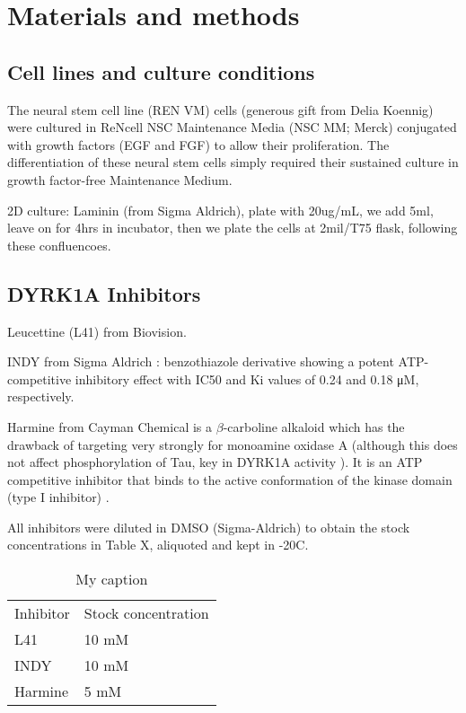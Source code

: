 \documentclass[onecolumn,10pt]{asme2ej}
\begin{document}
\section{Materials and methods}

\subsection{Cell lines and culture conditions}
The neural stem cell line (REN VM) cells (generous gift from Delia Koennig) were cultured in ReNcell NSC Maintenance Media (NSC MM; Merck) conjugated with growth factors (EGF and FGF) to allow their proliferation. The differentiation of these neural stem cells simply required their sustained culture in growth factor-free Maintenance Medium. 

2D culture:
Laminin (from Sigma Aldrich), plate with 20ug/mL, we add 5ml, leave on for 4hrs in incubator, then we plate the cells at 2mil/T75 flask, following these confluencoes.
 

\subsection{DYRK1A Inhibitors}

Leucettine (L41) from Biovision.

 INDY from Sigma Aldrich : benzothiazole derivative showing a potent ATP-competitive inhibitory effect with IC50 and Ki values of 0.24 and 0.18 μM, respectively.
 
 Harmine from Cayman Chemical is a $\beta$-carboline alkaloid which has the drawback of targeting very strongly for monoamine oxidase A (although this does not affect phosphorylation of Tau, key in DYRK1A activity \cite{Frost}). It is an ATP competitive inhibitor that binds to the active conformation of the kinase domain (type I inhibitor) \cite{Ruben2015}.


All inhibitors were diluted in DMSO (Sigma-Aldrich) to obtain the stock concentrations in Table X, aliquoted and kept in -20C.

\begin{table}[h]
	\centering
	\caption{My caption}
	\label{my-label}
	\begin{tabular}{ll}
		Inhibitor & Stock concentration \\
		L41       &    10 mM                 \\
		INDY      &    10 mM                 \\
		Harmine   &    5 mM             
	\end{tabular}
\end{table}
\end{document}
